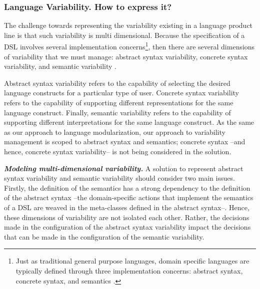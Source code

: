 \subsubsection{Language Variability. \textbf{How to express it?}}

The challenge towards representing the variability existing in a language product line is that such variability is multi dimensional. Because the specification of a DSL involves several implementation concerns\footnote{Just as traditional general purpose languages, domain specific languages are typically defined through three implementation concerns: abstract syntax, concrete syntax, and semantics \cite{Harel:2004b}.}, then there are several dimensions of variability that we must manage: abstract syntax variability, concrete syntax variability, and semantic variability \cite{Cengarle:2009,Gronniger:2011}.

Abstract syntax variability refers to the capability of selecting the desired language constructs for a particular type of user. Concrete syntax variability refers to the capability of supporting different representations for the same language construct. Finally, semantic variability refers to the capability of supporting different interpretations for the same language construct. As the same as our approach to language modularization, our approach to variability management is scoped to abstract syntax and semantics; concrete syntax --and hence, concrete syntax variability-- is not being considered in the solution. 


\vspace{2mm}
\textbf{\textit{Modeling multi-dimensional variability.}} A solution to represent abstract syntax variability and semantic variability should consider two main issues. Firstly, the definition of the semantics has a strong dependency to the definition of the abstract syntax --the domain-specific actions that implement the semantics of a DSL are weaved in the meta-classes defined in the abstract syntax--. Hence, these dimensions of variability are not isolated each other. Rather, the decisions made in the configuration of the abstract syntax variability impact the decisions that can be made in the configuration of the semantic variability. 

